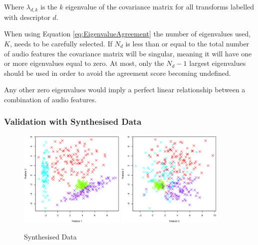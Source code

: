 			Where $\lambda_{d, k}$ is the $k$ eigenvalue of the covariance matrix for all transforms
			labelled with descriptor $d$.

			When using Equation \ref{eq:EigenvalueAgreement} the number of eigenvalues used, $K$, needs to be
			carefully selected. If $N_{d}$ is less than or equal to the total number of audio features the
			covariance matrix will be singular, meaning it will have one or more eigenvalues equal to zero. At
			most, only the $N_{d} - 1$ largest eigenvalues should be used in order to avoid the agreement score
			becoming undefined.

			Any other zero eigenvalues would imply a perfect linear relationship between a combination of audio
			features. 

		\subsubsection*{Validation with Synthesised Data}
			\begin{figure}[h!]
				\centering
				\subfloat
				{
					\includegraphics[width=0.45\textwidth]{chapter4/Images/ArtificialData1-2.eps}
					\label{fig:EqualiserDifferencePCA}
				}
				\qquad
				\subfloat
				{
					\includegraphics[width=0.45\textwidth]{chapter4/Images/ArtificialData3-2.eps}
					\label{fig:EqualiserDifferenceCentroidsPCA}
				}
				\caption{Synthesised Data}
				\label{fig:SynthesisedData}
			\end{figure}


